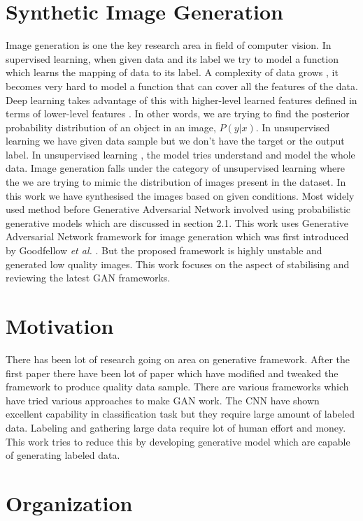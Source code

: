 \section{Synthetic Image Generation}
Image generation is one the key research area in field of computer vision. In supervised learning, when given data and its label we try to model a function which learns the mapping of data to its label. A complexity of data grows , it becomes very hard to model a function that can cover all the features of the data. Deep learning takes advantage of this with higher-level learned
features defined in terms of lower-level features \cite{bengio2012deep}. In other words, we are trying to find the posterior probability distribution of an object in an image, $P(y|x)$.
In unsupervised learning we have given data sample but we don't have the target or the output label. In unsupervised learning , the model tries understand and model the whole data. Image generation falls under the category of unsupervised learning where the we are trying to mimic the distribution of images present in the dataset. In this work we have synthesised the images based on given conditions. Most widely used method before Generative Adversarial Network involved using probabilistic generative models which are discussed in section 2.1. This work uses Generative Adversarial Network framework for image generation which was first introduced by Goodfellow \textit{et al.} \cite{Original-GAN}. But the proposed  framework is highly unstable and generated low quality images. This work focuses on the aspect of stabilising and reviewing the latest GAN frameworks.

\section{Motivation}

There has been lot of research going on area on generative framework. After the first paper there have been lot of paper which have modified and tweaked the framework to produce quality data sample. There are various frameworks which have tried various approaches to make GAN work. 
The CNN have shown excellent capability in classification task\cite{CNN-Better} but they require large amount of labeled data. Labeling and gathering large data require lot of human effort and money. This work tries to reduce this by developing generative model which are capable of generating labeled data.


\section{Organization}

